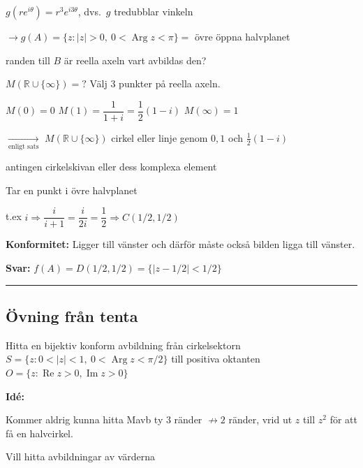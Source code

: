 $g(re^{i\theta}) = r^3 e^{i3\theta}$, dvs.\ $g$ tredubblar vinkeln

$\to g(A) = \{z : |z| > 0,\ 0 < \operatorname{Arg} z < \pi\} =$ övre öppna halvplanet

\textcolor{magenta!80!black}{randen till $B$ är reella axeln vart avbildas den?}

$M(\mathbb{R} \cup \{\infty\}) = ?$ \quad Välj 3 punkter på reella axeln.

$M(0) = 0$ \qquad $M(1) = \dfrac{1}{1 + i} = \dfrac{1}{2}(1 - i)$ \qquad $M(\infty) = 1$

$\xrightarrow[\text{enligt sats}]{}$ $M(\mathbb{R} \cup \{\infty\})$ cirkel eller linje genom $0, 1$ och $\frac{1}{2}(1 - i)$

\textcolor{magenta!80!black}{antingen cirkelskivan eller dess komplexa element}

\textcolor{magenta!80!black}{Tar en punkt i övre halvplanet}

t.ex $i \Rightarrow \dfrac{i}{i + 1} = \dfrac{i}{2i} = \dfrac{1}{2} \Rightarrow C(1/2, 1/2)$

\textbf{Konformitet:}
\textcolor{magenta!80!black}{Ligger till vänster och därför måste också bilden ligga till vänster.}

\textbf{Svar:} $f(A) = D(1/2, 1/2) = \{|z - 1/2| < 1/2\}$

\noindent\rule{\linewidth}{0.4pt}

\subsection{Övning från tenta}
Hitta en bijektiv konform avbildning från cirkelsektorn $S = \{z : 0 < |z| < 1,\ 0 < \operatorname{Arg} z < \pi/2\}$ till positiva oktanten $O = \{z : \operatorname{Re} z > 0, \operatorname{Im} z > 0\}$

\textbf{Idé:}

Kommer aldrig kunna hitta Mavb ty $3$ ränder $\not\to 2$ ränder, vrid ut $z$ till $z^2$ \textcolor{blue!60!black}{för att få en halvcirkel.}

\textcolor{blue!60!black}{Vill hitta avbildningar av värderna}
